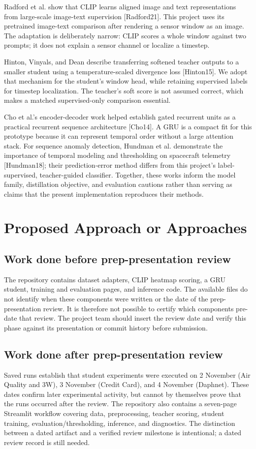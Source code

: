 \documentclass[twoside,english]{article}
\renewcommand{\cite}[1]{[#1]}
\begin{document}
Radford et al. show that CLIP learns aligned image and text representations from large-scale image-text supervision \cite{Radford21}. This project uses its pretrained image-text comparison after rendering a sensor window as an image. The adaptation is deliberately narrow: CLIP scores a whole window against two prompts; it does not explain a sensor channel or localize a timestep.

Hinton, Vinyals, and Dean describe transferring softened teacher outputs to a smaller student using a temperature-scaled divergence loss \cite{Hinton15}. We adopt that mechanism for the student's window head, while retaining supervised labels for timestep localization. The teacher's soft score is not assumed correct, which makes a matched supervised-only comparison essential.

Cho et al.'s encoder-decoder work helped establish gated recurrent units as a practical recurrent sequence architecture \cite{Cho14}. A GRU is a compact fit for this prototype because it can represent temporal order without a large attention stack. For sequence anomaly detection, Hundman et al. demonstrate the importance of temporal modeling and thresholding on spacecraft telemetry \cite{Hundman18}; their prediction-error method differs from this project's label-supervised, teacher-guided classifier. Together, these works inform the model family, distillation objective, and evaluation cautions rather than serving as claims that the present implementation reproduces their methods.

\section{Proposed Approach or Approaches} \label{sec:our_proj}
\subsection{Work done before prep-presentation review}
The repository contains dataset adapters, CLIP heatmap scoring, a GRU student, training and evaluation pages, and inference code. The available files do not identify when these components were written or the date of the prep-presentation review. It is therefore not possible to certify which components pre-date that review. The project team should insert the review date and verify this phase against its presentation or commit history before submission.

\subsection{Work done after prep-presentation review}
Saved runs establish that student experiments were executed on 2 November (Air Quality and 3W), 3 November (Credit Card), and 4 November (Daphnet). These dates confirm later experimental activity, but cannot by themselves prove that the runs occurred after the review. The repository also contains a seven-page Streamlit workflow covering data, preprocessing, teacher scoring, student training, evaluation/thresholding, inference, and diagnostics. The distinction between a dated artifact and a verified review milestone is intentional; a dated review record is still needed.
\end{document}
